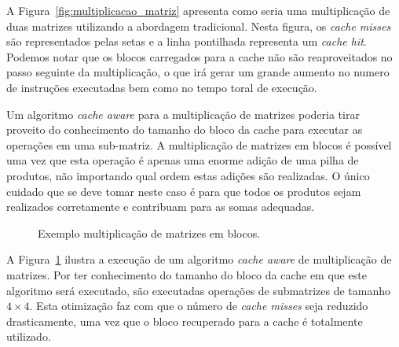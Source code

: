 A Figura~\ref{fig:multiplicacao_matriz} apresenta como seria uma multiplicação de duas matrizes utilizando a abordagem tradicional. Nesta figura, os \textit{cache misses} são representados pelas setas e a linha pontilhada representa um \textit{cache hit}. Podemos notar que os blocos carregados para a cache não são reaproveitados no passo seguinte da multiplicação, o que irá gerar um grande aumento no numero de instruções executadas bem como no tempo toral de execução.

Um algoritmo \textit{cache aware} para a multiplicação de matrizes poderia tirar proveito do conhecimento do tamanho do bloco da cache para executar as operações em uma sub-matriz.
A multiplicação de matrizes em blocos é possível uma vez que esta operação é apenas uma enorme adição de uma pilha de produtos, não importando qual ordem estas adições são realizadas.
O único cuidado que se deve tomar neste caso é para que todos os produtos sejam realizados corretamente e contribuam para as somas adequadas.

\begin{figure}[hb]
    \centering
    \caption[Exemplo multiplicação de matrizes em blocos]{Exemplo multiplicação de matrizes em blocos.}
    \label{fig:multiplicacao_matriz_bloco}
\end{figure}

A Figura~\ref{fig:multiplicacao_matriz_bloco} ilustra a execução de um algoritmo \textit{cache aware} de multiplicação de matrizes. Por ter conhecimento do tamanho do bloco da cache em que este algoritmo será executado, são executadas operações de submatrizes de tamanho $4 \times 4$. Esta otimização faz com que o número de \textit{cache misses} seja reduzido drasticamente, uma vez que o bloco recuperado para a cache é totalmente utilizado.

